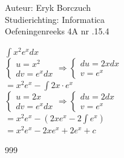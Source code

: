 \documentclass[a4paper]{article}
\begin{document}
  
\noindent \large Auteur: Eryk Borczuch \\
\noindent \large Studierichting: Informatica\\
\noindent \large Oefeningenreeks 4A nr .15.4\\

\medskip

\normalsize

$\displaystyle \int x^2 e^x dx$\\

$\left \{
\begin{array}{l}
u= x^2 \\
dv= e^xdx
\end{array}
\right .
\Rightarrow
\left \{
\begin{array}{l}
du= 2xdx \\
v= e^x
\end{array}
\right .$\\

$\displaystyle= x^2 e^x - \int 2x \cdot e^x$\\


$\left \{
\begin{array}{l}
u= 2x \\
dv= e^xdx
\end{array}
\right .
\Rightarrow
\left \{
\begin{array}{l}
du= 2dx \\
v= e^x
\end{array}
\right .$\\

$ = x^2 e^x - \left(2xe^x -2 \displaystyle\int e^x\right)$\\

$= x^2 e^x -2x e^x + 2e^x +c$


\begin{thebibliography}{999}
\end{thebibliography}
\end{document}
